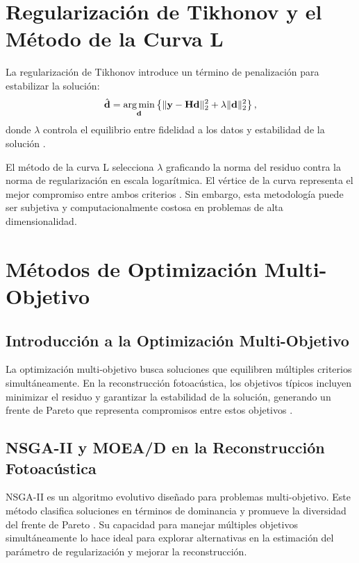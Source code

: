 \section{Regularización de Tikhonov y el Método de la Curva L} \label{sec:lit:tikhonov}

La regularización de Tikhonov introduce un término de penalización para estabilizar la solución:
\begin{equation}
    \hat{\mathbf{d}} = \operatorname*{arg\,min}_{\mathbf{d}} \left\{ \| \mathbf{y} - \mathbf{H} \mathbf{d} \|_2^2 + \lambda \| \mathbf{d} \|_2^2 \right\},
\end{equation}
donde $\lambda$ controla el equilibrio entre fidelidad a los datos y estabilidad de la solución \cite{Tikhonov1963}.

El método de la curva L selecciona $\lambda$ graficando la norma del residuo contra la norma de regularización en escala logarítmica. El vértice de la curva representa el mejor compromiso entre ambos criterios \cite{Hansen1992}. Sin embargo, esta metodología puede ser subjetiva y computacionalmente costosa en problemas de alta dimensionalidad.

\section{Métodos de Optimización Multi-Objetivo} \label{sec:lit:second}

\subsection{Introducción a la Optimización Multi-Objetivo} \label{sec:lit:second:one}

La optimización multi-objetivo busca soluciones que equilibren múltiples criterios simultáneamente. En la reconstrucción fotoacústica, los objetivos típicos incluyen minimizar el residuo y garantizar la estabilidad de la solución, generando un frente de Pareto que representa compromisos entre estos objetivos \cite{Boyd2004}.

\subsection{NSGA-II y MOEA/D en la Reconstrucción Fotoacústica} \label{sec:lit:second:two}

NSGA-II es un algoritmo evolutivo diseñado para problemas multi-objetivo. Este método clasifica soluciones en términos de dominancia y promueve la diversidad del frente de Pareto \cite{Deb2002}. Su capacidad para manejar múltiples objetivos simultáneamente lo hace ideal para explorar alternativas en la estimación del parámetro de regularización y mejorar la reconstrucción.

